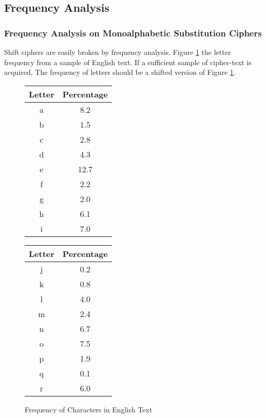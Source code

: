 \documentclass[12pt]{article}
\begin{document}
\subsection{Frequency Analysis}
\subsubsection{Frequency Analysis on Monoalphabetic Substitution Ciphers}
Shift ciphers are easily broken by frequency analysis. Figure \ref{freqchars} the letter frequency from a sample of English text. If a sufficient sample of cipher-text is acquired, The frequency of letters should be a shifted version of Figure \ref{freqchars}.

\begin{figure}[ht]
	\caption{Frequency of Characters in English Text}
	\label{freqchars}
	\begin{center}
		\begin{multicols}{3}
			\begin{tabular}{||c | c||}
				\hline
				Letter & Percentage \\
				\hline\hline
				a & 8.2 \\ 
				\hline
				b & 1.5 \\
				\hline
				c & 2.8 \\
				\hline
				d & 4.3 \\
				\hline
				e & 12.7 \\
				\hline
				f & 2.2 \\
				\hline
				g & 2.0 \\
				\hline
				h & 6.1 \\
				\hline
				i & 7.0 \\
				\hline
			\end{tabular}
			
			\columnbreak
			
			\begin{tabular}{||c | c||}
				\hline
				Letter & Percentage \\
				\hline\hline
				j & 0.2 \\
				\hline
				k & 0.8 \\
				\hline
				l & 4.0 \\
				\hline
				m & 2.4 \\
				\hline
				n & 6.7 \\
				\hline
				o & 7.5 \\
				\hline
				p & 1.9 \\
				\hline
				q & 0.1 \\
				\hline
				r & 6.0 \\
				\hline 
			\end{tabular}
			

\end{multicols}
\end{center}
\end{figure}
\end{document}
